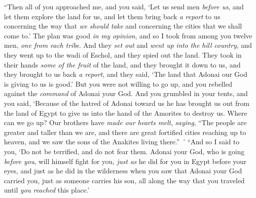 \begin{biblechapter}
{{{\verse “Then all of you approached me, and you said, ‘Let us send men \textit{before us}, and let them explore the land for us, and let them bring back \textit{a report} to us concerning the way that \textit{we should take} and concerning the cities that we shall come to.’
\verse The plan was good \textit{in my opinion}, and so I took from among you twelve men, \textit{one from each tribe}.
\verse And they \textit{set out} and \textit{went up into the hill country}, and they went up to the wadi of Eschol, and they spied out the land.
\verse They took in their hands \textit{some of the fruit} of the land, and they brought it down to us, and they brought to us back \textit{a report}, and they said, ‘The land that Adonai our God is giving to us is good.’
\verse But you were not willing to go up, and you rebelled against the \textit{command} of Adonai your God.
\verse And you grumbled in your tents, and you said, ‘Because of the hatred of Adonai toward us he has brought us out from the land of Egypt to give us into the hand of the Amorites to destroy us.
\verse Where can we go up? Our brothers have \textit{made our hearts melt}, \textit{saying}, “The people are greater and taller than we are, and there are great fortified cities reaching up to heaven, and we saw the sons of the Anakites living there.” ’
\verse “And so I said to you, ‘Do not be terrified, and do not fear them.
\verse Adonai your God, who is going \textit{before you}, will himself fight for you, \textit{just as} he did for you in Egypt before your eyes,
\verse and just as he did in the wilderness when you saw that Adonai your God carried you, just as someone carries his son, all along the way that you traveled until \textit{you reached} this place.’
}}}
\end{biblechapter}
